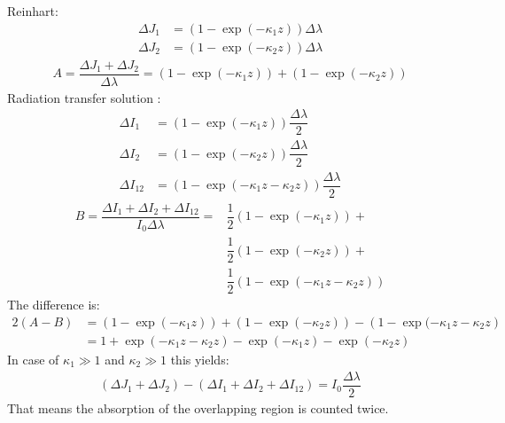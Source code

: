 Reinhart:
\begin{align}
	\Delta J_1 &= \left(1 - \exp( - \kappa_1 z)\right) \Delta \lambda \\
	\Delta J_2 &= \left(1 - \exp( - \kappa_2 z)\right) \Delta \lambda 
\end{align}
\begin{align}
	A = \dfrac{\Delta J_1 + \Delta J_2}{\Delta \lambda} = \left(1 - \exp( - \kappa_1 z)\right) + \left(1 - \exp( - \kappa_2 z)\right)
\end{align}
Radiation transfer solution :
\begin{align}
	\Delta I_1 &= \left(1 - \exp( - \kappa_1 z)\right) \dfrac{\Delta \lambda}{2} \\
	\Delta I_2 &=  \left(1 - \exp( - \kappa_2 z)\right) \dfrac{\Delta \lambda}{2} \\
	\Delta I_{12} &= \left(1 - \exp( - \kappa_1 z - \kappa_2 z)\right) \dfrac{\Delta \lambda}{2}
\end{align}
\begin{align}
	B = \dfrac{\Delta I_1 + \Delta I_2 + \Delta I_{12}}{I_0 \Delta \lambda} =
			& \dfrac{1}{2} \left(1 - \exp( - \kappa_1 z)\right) +  \\
			& \dfrac{1}{2} \left(1 - \exp( - \kappa_2 z)\right) + \\ 
			& \dfrac{1}{2} \left(1 - \exp( - \kappa_1 z - \kappa_2 z)\right) 
\end{align}
The difference is:
\begin{align}
	2(A - B) &= \left(1 - \exp( - \kappa_1 z)\right) + \left(1 - \exp( - \kappa_2 z)\right) -
	\left(1 - \exp( - \kappa_1 z - \kappa_2 z\right) \\
	         &= 1  + \exp(- \kappa_1 z - \kappa_2 z) - \exp( - \kappa_1 z) - \exp( - \kappa_2 z)
\end{align}
In case of $\kappa_1 \gg 1$ and $\kappa_2 \gg 1$ this yields: 
\begin{align}
	(\Delta J_1 + \Delta J_2) - (\Delta I_1 + \Delta I_2 + \Delta I_{12})=
	I_0 \dfrac{\Delta \lambda}{2}
\end{align}
That means the absorption of the overlapping region is counted twice.